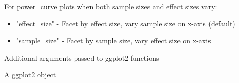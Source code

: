 \documentclass[letterpaper]{book}
\begin{document}
\begin{Arguments}
\begin{ldescription}
\item[\code{facet\_by}] For power\_curve plots when both sample sizes and effect sizes vary:
\begin{itemize}

\item{} "effect\_size" - Facet by effect size, vary sample size on x-axis (default)
\item{} "sample\_size" - Facet by sample size, vary effect size on x-axis

\end{itemize}


\item[\code{...}] Additional arguments passed to ggplot2 functions
\end{ldescription}
\end{Arguments}
%
\begin{Value}
A ggplot2 object
\end{Value}
%
\end{document}
